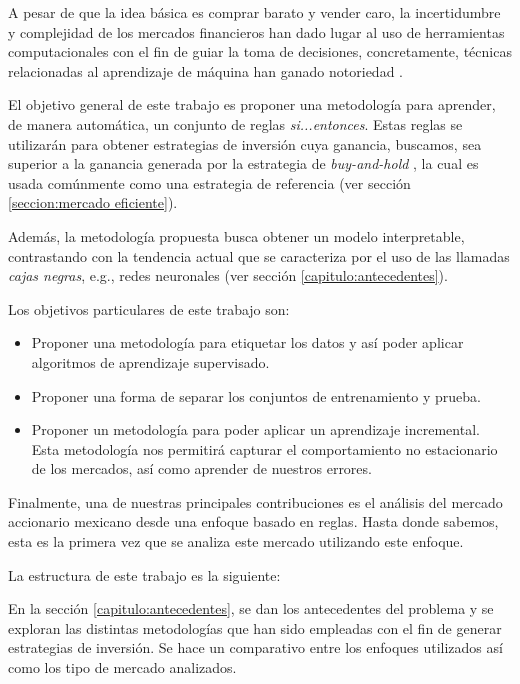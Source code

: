 \documentclass[12pt]{scrbook}
\theoremstyle{break}
\theoremstyle{break}
\newcommand{\buyhold}{\textit{buy-and-hold} }
\begin{document}
A pesar de que la idea básica es comprar barato y vender caro, la incertidumbre y complejidad de los mercados financieros han dado lugar al uso de herramientas computacionales con el fin de guiar la toma de decisiones, concretamente, técnicas relacionadas al aprendizaje de máquina han ganado notoriedad \cite{AdvancesMLFinance}.

El objetivo general de este trabajo es proponer una metodología para aprender, de manera automática, un conjunto de reglas \textit{si...entonces}. Estas reglas se utilizarán para obtener estrategias de inversión cuya ganancia, buscamos, sea superior a la ganancia generada por la estrategia de \buyhold, la cual es usada comúnmente como una estrategia de referencia (ver sección \ref{seccion:mercado eficiente}).

Además, la metodología propuesta busca obtener un modelo interpretable, contrastando con la tendencia actual que se caracteriza por el uso de las llamadas \textit{cajas negras}, e.g., redes neuronales (ver sección \ref{capitulo:antecedentes}).

Los objetivos particulares de este trabajo son:
\begin{itemize}

\item Proponer una metodología para etiquetar los datos y así poder aplicar algoritmos de aprendizaje supervisado.

\item Proponer una forma de separar los conjuntos de entrenamiento y prueba.

\item Proponer un metodología para poder aplicar un aprendizaje incremental. Esta metodología nos permitirá capturar el comportamiento no estacionario de los mercados, así como aprender de nuestros errores.
\end{itemize}

Finalmente, una de nuestras principales contribuciones es el análisis del mercado accionario mexicano desde una enfoque basado en reglas. Hasta donde sabemos, esta es la primera vez que se analiza este mercado utilizando este enfoque.

La estructura de este trabajo es la siguiente:

En la sección \ref{capitulo:antecedentes}, se dan los antecedentes del problema y se exploran las distintas metodologías que han sido empleadas con el fin de generar estrategias de inversión. Se hace un comparativo entre los enfoques utilizados así como los tipo de mercado analizados.
\end{document}
